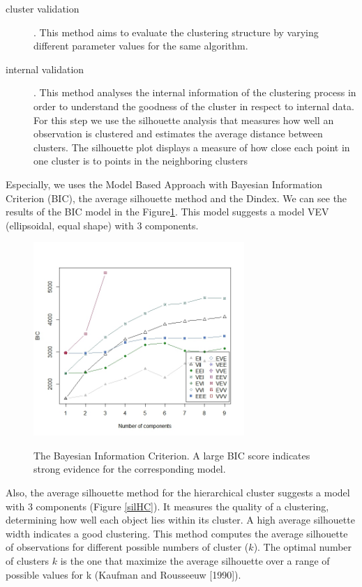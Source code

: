 \documentclass[a4paper]{article}
\begin{document}
\begin{description}
    \item[cluster validation]. This method  aims to evaluate the clustering structure by varying different parameter values for the same algorithm.
    \item[internal validation]. This method analyses the internal information of the clustering process in order to understand the goodness of the cluster in respect to internal data. For this step we use the silhouette analysis that measures how well an observation is clustered and estimates the average distance between clusters. The silhouette plot displays a measure of how close each point in one cluster is to points in the neighboring clusters
\end{description}

Especially, we uses the Model Based Approach with Bayesian Information Criterion (BIC), the average silhouette method and the Dindex.
We can see the results of the BIC model in the Figure\ref{BIC}. This model suggests a model VEV (ellipsoidal, equal shape) with 3 components.

\begin{figure}[h]
  \centering
    \includegraphics[width=8cm]{BIC}\\
  \caption{The Bayesian Information Criterion. A large BIC score indicates strong evidence for the corresponding model.}\label{BIC}
\end{figure}

Also, the average silhouette method for the hierarchical cluster suggests a model with 3 components (Figure \ref{silHC}). It measures the quality of a clustering, determining how well each object lies within its cluster. A high average silhouette width indicates a good clustering. This method computes the average silhouette of observations for different possible numbers of cluster ($k$). The optimal number of clusters $k$ is the one that maximize the average silhouette over a range of possible values for k (Kaufman and Rousseeuw [1990]).
\end{document}
